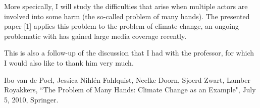\documentclass[../main/main.tex]{subfiles}
\begin{document}
More specically, I will study the difficulties that arise when multiple actors are involved into some harm (the so-called problem of many hands). The presented paper [1] applies this problem to the problem of climate change, an ongoing problematic with has gained large media coverage recently. 

This is also a follow-up of the discussion that I had with the professor, for which I would also like to thank him very much.

\vfill
\begin{thebibliography}{12}  
 Ibo van de Poel, Jessica Nihlén Fahlquist, Neelke Doorn, Sjoerd Zwart, Lamber Royakkers, ``The Problem of Many Hands: Climate Change as an Example", July 5, 2010, Springer.

\end{thebibliography}
\end{document}
